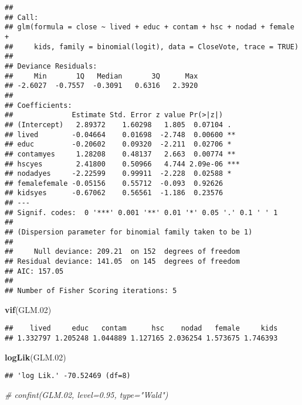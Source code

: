 \documentclass[
]{article}
\newenvironment{Shaded}{\begin{snugshade}}{\end{snugshade}}
\newcommand{\CommentTok}[1]{\textcolor[rgb]{0.56,0.35,0.01}{\textit{#1}}}
\newcommand{\FloatTok}[1]{\textcolor[rgb]{0.00,0.00,0.81}{#1}}
\newcommand{\KeywordTok}[1]{\textcolor[rgb]{0.13,0.29,0.53}{\textbf{#1}}}
\newcommand{\NormalTok}[1]{#1}
\begin{document}
\begin{verbatim}
## 
## Call:
## glm(formula = close ~ lived + educ + contam + hsc + nodad + female + 
##     kids, family = binomial(logit), data = CloseVote, trace = TRUE)
## 
## Deviance Residuals: 
##     Min       1Q   Median       3Q      Max  
## -2.6027  -0.7557  -0.3091   0.6316   2.3920  
## 
## Coefficients:
##              Estimate Std. Error z value Pr(>|z|)    
## (Intercept)   2.89372    1.60298   1.805  0.07104 .  
## lived        -0.04664    0.01698  -2.748  0.00600 ** 
## educ         -0.20602    0.09320  -2.211  0.02706 *  
## contamyes     1.28208    0.48137   2.663  0.00774 ** 
## hscyes        2.41800    0.50966   4.744 2.09e-06 ***
## nodadyes     -2.22599    0.99911  -2.228  0.02588 *  
## femalefemale -0.05156    0.55712  -0.093  0.92626    
## kidsyes      -0.67062    0.56561  -1.186  0.23576    
## ---
## Signif. codes:  0 '***' 0.001 '**' 0.01 '*' 0.05 '.' 0.1 ' ' 1
## 
## (Dispersion parameter for binomial family taken to be 1)
## 
##     Null deviance: 209.21  on 152  degrees of freedom
## Residual deviance: 141.05  on 145  degrees of freedom
## AIC: 157.05
## 
## Number of Fisher Scoring iterations: 5
\end{verbatim}

\begin{Shaded}
\begin{Highlighting}[]
\KeywordTok{vif}\NormalTok{(GLM}\FloatTok{.02}\NormalTok{)}
\end{Highlighting}
\end{Shaded}

\begin{verbatim}
##    lived     educ   contam      hsc    nodad   female     kids 
## 1.332797 1.205248 1.044889 1.127165 2.036254 1.573675 1.746393
\end{verbatim}

\begin{Shaded}
\begin{Highlighting}[]
\KeywordTok{logLik}\NormalTok{(GLM}\FloatTok{.02}\NormalTok{)}
\end{Highlighting}
\end{Shaded}

\begin{verbatim}
## 'log Lik.' -70.52469 (df=8)
\end{verbatim}

\begin{Shaded}
\begin{Highlighting}[]
\CommentTok{# confint(GLM.02, level=0.95, type="Wald")}
\end{Highlighting}
\end{Shaded}
\end{document}
